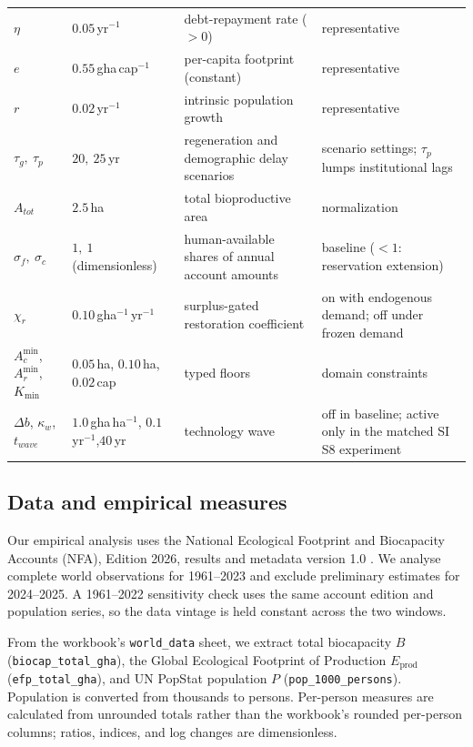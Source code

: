 \documentclass[preprint,12pt,authoryear]{elsarticle}
\newcommand{\Acmin}{A_c^{\min}}
\begin{document}
\begin{table}[!htbp]
\begin{tabularx}{\textwidth}{@{}>{\raggedright\arraybackslash}p{} >{\raggedright\arraybackslash}p{} >{\raggedright\arraybackslash}X >{\raggedright\arraybackslash}p{}@{}}
$\eta$ & $0.05$\,yr$^{-1}$ & debt-repayment rate ($>0$) & representative \\
$e$ & $0.55$\,gha\,cap$^{-1}$ & per-capita footprint (constant) & representative \\
$r$ & $0.02$\,yr$^{-1}$ & intrinsic population growth & representative \\
$\tau_g,\ \tau_p$ & $20,\ 25$\,yr & regeneration and demographic delay scenarios & scenario settings; $\tau_p$ lumps institutional lags \\
$A_{tot}$ & $2.5$\,ha & total bioproductive area & normalization \\
$\sigma_f,\ \sigma_c$ & $1,\ 1$ (dimensionless) & human-available shares of annual account amounts & baseline ($<1$: reservation extension) \\
$\chi_r$ & $0.10$\,gha$^{-1}$\,yr$^{-1}$ & surplus-gated restoration coefficient & on with endogenous demand; off under frozen demand \\
$\Acmin$, $A_r^{\min}$,\newline $K_{\min}$ & $0.05$\,ha, $0.10$\,ha,\newline $0.02$\,cap & typed floors & domain constraints \\
$\Delta b$, $\kappa_w$,\newline $t_{wave}$ & $1.0$\,gha\,ha$^{-1}$, $0.1$\,yr$^{-1}$,\newline $40$\,yr & technology wave & off in baseline; active only in the matched SI S8 experiment \\
\bottomrule
\end{tabularx}
\end{table}

\subsection{Data and empirical measures}\label{sec:data}

Our empirical analysis uses the National Ecological Footprint and Biocapacity Accounts (NFA), Edition 2026, results and metadata version 1.0 \citep{Lo2026NFA}. We analyse complete world observations for 1961--2023 and exclude preliminary estimates for 2024--2025. A 1961--2022 sensitivity check uses the same account edition and population series, so the data vintage is held constant across the two windows.

From the workbook's \texttt{world\_data} sheet, we extract total biocapacity $B$ (\texttt{biocap\_total\_gha}), the Global Ecological Footprint of Production $E_{\mathrm{prod}}$ (\texttt{efp\_total\_gha}), and UN PopStat population $P$ (\texttt{pop\_1000\_persons}). Population is converted from thousands to persons. Per-person measures are calculated from unrounded totals rather than the workbook's rounded per-person columns; ratios, indices, and log changes are dimensionless.
\end{document}
